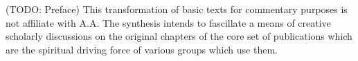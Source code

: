 \onecolumn


\begingroup
\fontsize{12pt}{11pt}\selectfont

(TODO: Preface)
This transformation of basic texts for commentary purposes is not affiliate with A.A.
The synthesis intends to fascillate a means of creative scholarly discussions 
on the original chapters of the core set of publications 
which are the spiritual driving force of various groups which use them.

\clearpage

